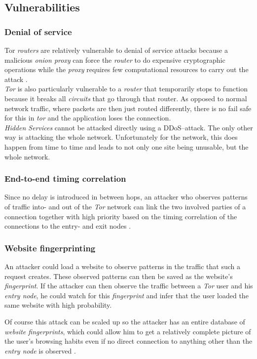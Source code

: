 \documentclass{sig-alternate}
\begin{document}
\subsection{Vulnerabilities}
\subsubsection{Denial of service}
Tor \emph{routers} are relatively vulnerable to denial of service attacks because a malicious
\emph{onion proxy} can force the \emph{router} to do expensive cryptographic operations while
the \emph{proxy} requires few computational resources to carry out the attack \cite{tor2004}.
\\
\emph{Tor} is also particularly vulnerable to a \emph{router} that temporarily stops to function
because it breaks all \emph{circuits} that go through that router. As opposed to normal network
traffic, where packets are then just routed differently, there is no fail safe for this in \emph{tor}
and the application loses the connection.
\\
\emph{Hidden Services} cannot be attacked directly using a DDoS--attack.
The only other way is attacking the whole network.
Unfortunately for the network, this does happen from time to time and leads to not only one site being unusable,
but the whole network\cite{syverson2006}.

\subsubsection{End-to-end timing correlation}
Since no delay is introduced in between hops, an attacker who observes patterns of traffic into- and out of the \emph{Tor} network can link the two involved parties of a connection together with high priority based on the timing correlation of the connections to the entry- and exit nodes \cite{tor2004}.

\subsubsection{Website fingerprinting}
An attacker could load a website to observe patterns in the traffic that such a request creates.
These observed patterns can then be saved as the website's \emph{fingerprint}. If the attacker
can then observe the traffic between a \emph{Tor} user and his \emph{entry node}, he could watch
for this \emph{fingerprint} and infer that the user loaded the same website with high probability.

Of course this attack can be scaled up so the attacker has an entire database of \emph{website
fingerprints}, which could allow him to get a relatively complete picture of the user's browsing
habits even if no direct connection to anything other than the \emph{entry node} is observed
\cite{panchenko2011}.
\end{document}
